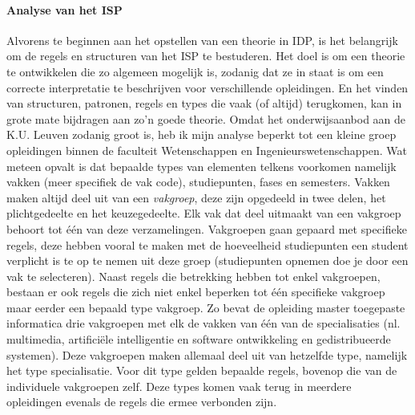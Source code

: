 \paragraph{Analyse van het ISP}
Alvorens te beginnen aan het opstellen van een theorie in IDP, is het belangrijk om de regels en structuren van het ISP te bestuderen. Het doel is om een theorie te ontwikkelen die zo algemeen mogelijk is, zodanig dat ze in staat is om een correcte interpretatie te beschrijven voor verschillende opleidingen. En het vinden van structuren, patronen, regels en types die vaak (of altijd) terugkomen, kan in grote mate bijdragen aan zo'n goede theorie. Omdat het onderwijsaanbod aan de K.U. Leuven zodanig groot is, heb ik mijn analyse beperkt tot een kleine groep opleidingen binnen de faculteit Wetenschappen en Ingenieurswetenschappen. Wat meteen opvalt is dat bepaalde types van elementen telkens voorkomen namelijk vakken (meer specifiek de vak code), studiepunten, fases en semesters. Vakken maken altijd deel uit van een \textit{vakgroep}, deze zijn opgedeeld in twee delen, het plichtgedeelte en het keuzegedeelte. Elk vak dat deel uitmaakt van een vakgroep behoort tot \'{e}\'{e}n van deze verzamelingen. Vakgroepen gaan gepaard met specifieke regels, deze hebben vooral te maken met de hoeveelheid studiepunten een student verplicht is te op te nemen uit deze groep (studiepunten opnemen doe je door een vak te selecteren). Naast regels die betrekking hebben tot enkel vakgroepen, bestaan er ook regels die zich niet enkel beperken tot \'{e}\'{e}n specifieke vakgroep maar eerder een bepaald type vakgroep. Zo bevat de opleiding master toegepaste informatica drie vakgroepen met elk de vakken van \'{e}\'{e}n van de specialisaties (nl. multimedia, artifici\"{e}le intelligentie en software ontwikkeling en gedistribueerde systemen). Deze  vakgroepen maken allemaal deel uit van hetzelfde type, namelijk het type specialisatie. Voor dit type gelden bepaalde regels, bovenop die van de individuele vakgroepen zelf. Deze types komen vaak terug in meerdere opleidingen evenals de regels die ermee verbonden zijn. 
